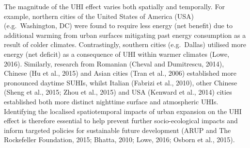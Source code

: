 \documentclass[]{book}
\begin{document}
The magnitude of the UHI effect varies both spatially and temporally.
For example, northern cities of the United States of America (USA)
(e.g.~Washington, DC) were found to require less energy (net benefit)
due to additional warming from urban surfaces mitigating past energy
consumption as a result of colder climates. Contrastingly, southern
cities (e.g.~Dallas) utilised more energy (net deficit) as a consequence
of UHI within warmer climates (Lowe, 2016). Similarly, research from
Romanian (Cheval and Dumitrescu, 2014), Chinese (Hu et al., 2015) and
Asian cities (Tran et al., 2006) established more pronounced daytime
SUHIs, whilst Italian (Fabrizi et al., 2010), other Chinese (Sheng et
al., 2015; Zhou et al., 2015) and USA (Kenward et al., 2014) cities
established both more distinct nighttime surface and atmospheric UHIs.
Identifying the localised spatiotemporal impacts of urban expansion on
the UHI effect is therefore essential to help prevent further
socio-ecological impacts and inform targeted policies for sustainable
future development (ARUP and The Rockefeller Foundation, 2015; Bhatta,
2010; Lowe, 2016; Osborn et al., 2015).
\end{document}
